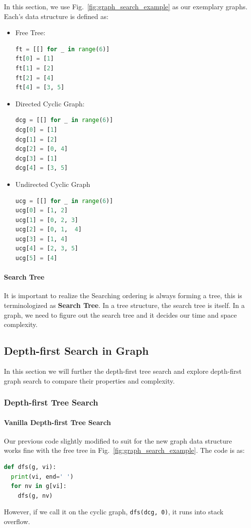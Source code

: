 \documentclass[main.tex]{subfiles}
\begin{document}
In this section, we use Fig.~\ref{fig:graph_search_example} as our exemplary graphs. Each's data structure is defined as:
\begin{itemize}
\item Free Tree:
\begin{lstlisting}[language=Python]
ft = [[] for _ in range(6)]
ft[0] = [1]
ft[1] = [2]
ft[2] = [4]
ft[4] = [3, 5]
\end{lstlisting}
    \item Directed Cyclic Graph:
    \begin{lstlisting}[language=Python]
dcg = [[] for _ in range(6)]
dcg[0] = [1]
dcg[1] = [2]
dcg[2] = [0, 4]
dcg[3] = [1]
dcg[4] = [3, 5]
\end{lstlisting}
\item Undirected Cyclic Graph
    \begin{lstlisting}[language=Python]
ucg = [[] for _ in range(6)]
ucg[0] = [1, 2]
ucg[1] = [0, 2, 3]
ucg[2] = [0, 1,  4]
ucg[3] = [1, 4]
ucg[4] = [2, 3, 5]
ucg[5] = [4]
\end{lstlisting}
\end{itemize}


\paragraph{Search Tree} It is important to realize the Searching ordering is always forming a tree, this is terminologized as \textbf{Search Tree}. In a tree structure, the search tree is itself. In a graph, we need to figure out the search tree and it decides our time and space complexity. 


 
\subsection{Depth-first Search in Graph}
In this section we will further the depth-first tree search and explore depth-first graph search to compare their properties and complexity.  
\subsubsection{Depth-first Tree Search} 

\paragraph{Vanilla Depth-first Tree Search} Our previous code slightly modified to suit for the new graph data structure works fine with the free tree in Fig.~\ref{fig:graph_search_example}. The code is as:
\begin{lstlisting}[language=Python]
def dfs(g, vi):
  print(vi, end=' ')
  for nv in g[vi]:   
    dfs(g, nv)
\end{lstlisting}
However, if we call it on the cyclic graph, \texttt{dfs(dcg, 0)}, it runs into stack overflow.
\end{document}
